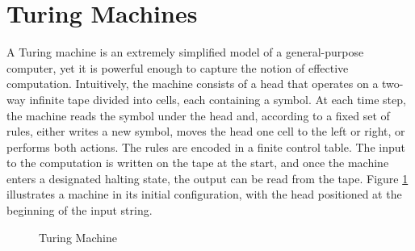%
%

\section{Turing Machines}
\label{sec:Turing-Machines}

A Turing machine is an extremely simplified model of a general-purpose computer, yet it is powerful enough to capture the notion of effective computation. Intuitively, the machine consists of a head that operates on a two-way infinite tape divided into cells, each containing a symbol. At each time step, the machine reads the symbol under the head and, according to a fixed set of rules, either writes a new symbol, moves the head one cell to the left or right, or performs both actions. The rules are encoded in a finite control table. The input to the computation is written on the tape at the start, and once the machine enters a designated halting state, the output can be read from the tape. Figure \ref{fig:Turing-Machine} illustrates a machine in its initial configuration, with the head positioned at the beginning of the input string.

\begin{figure}[t]
\centering
{}
\caption{\label{fig:Turing-Machine}Turing Machine}
\end{figure}

